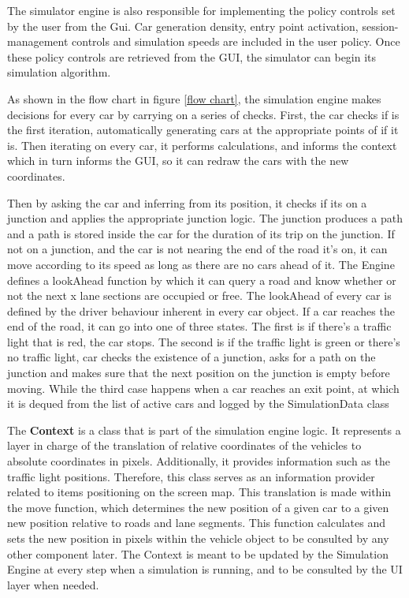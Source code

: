 \documentclass[11pt]{article}
\begin{document}
The simulator engine is also responsible for implementing the policy controls set by the user from the Gui. Car generation density, entry point activation, session-management controls and simulation speeds are included in the user policy. Once these policy controls are retrieved from the GUI, the simulator can begin its simulation algorithm.

As shown in the flow chart in figure \ref{flow chart}, the simulation engine makes decisions for every car by carrying on a series of checks. First, the car checks if is the first iteration, automatically generating cars at the appropriate points of if it is. Then iterating on every car, it performs calculations, and informs  the context which in turn informs the GUI, so it can redraw the cars with the new coordinates. 

Then by asking the car and inferring from its position, it checks if its on a junction and applies the appropriate junction logic. The junction produces a path and a path is stored inside the car for the duration of its trip on the junction. If not on a junction, and the car is not nearing the end of the road it's on, it can move according to its speed as long as there are no cars ahead of it. The Engine defines a lookAhead function by which it can query a road and know whether or not the next x lane sections are occupied or free. The lookAhead of every car is defined by the driver behaviour inherent in every car object. If a car reaches the end of the road, it can go into one of three states. The first is  if there's a traffic light that is red, the car stops. The second is if the traffic light is green or there's no traffic light, car checks the existence of a junction, asks for a path on the junction and makes sure that the next position on the junction is empty before moving. While the third case happens when a car reaches an exit point, at which it is dequed from the list of active cars and logged by the SimulationData class 


The \textbf{Context} is a class that is part of the simulation engine logic. It represents a layer in charge of the translation of relative coordinates of the vehicles to absolute coordinates in pixels. Additionally, it provides information such as the traffic light positions. Therefore, this class serves as an information provider related to items positioning on the screen map.
This translation is made within the move function, which determines the new position of a given car to a given new position relative to roads and lane segments. This function calculates and sets the new position in pixels within the vehicle object to be consulted by any other component later.
The Context is meant to be updated by the Simulation Engine at every step when a simulation is running, and to be consulted by the UI layer when needed.
\end{document}
